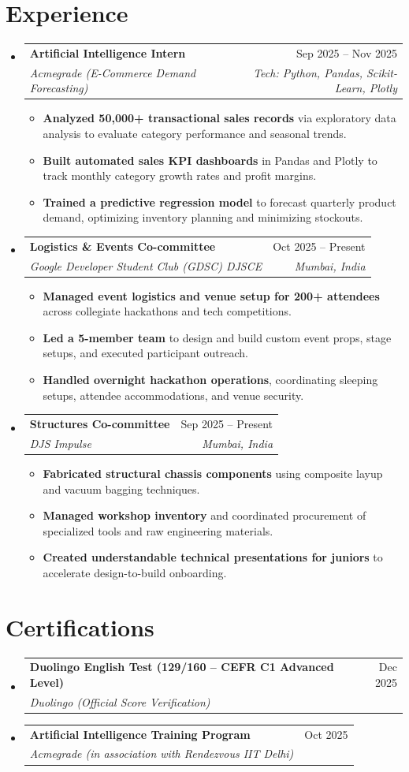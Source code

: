\documentclass[letterpaper,10pt]{article}
\makeatletter
\newcommand{\resumeItem}[1]{
  \item\small{#1}
}
\newcommand{\resumeSubheading}[4]{
  \item
    \begin{tabular*}{0.98\textwidth}[t]{l@{\extracolsep{\fill}}r}
      \textbf{#1} & \small#2 \\
      \textit{\small#3} & \textit{\small #4} \\
    \end{tabular*}\vspace{-2pt}
}
\newcommand{\resumeSubHeadingListStart}{\begin{itemize}[leftmargin=0.12in, label={}, itemsep=3pt, parsep=0pt, topsep=2pt]}
\newcommand{\resumeSubHeadingListEnd}{\end{itemize}}
\newcommand{\resumeItemListStart}{\begin{itemize}[leftmargin=0.18in, itemsep=1.5pt, parsep=0pt, topsep=1.5pt, partopsep=0pt]}
\newcommand{\resumeItemListEnd}{\end{itemize}\vspace{-2pt}}
\makeatother
\begin{document}
\section{Experience}
  \resumeSubHeadingListStart
    \resumeSubheading
      {Artificial Intelligence Intern}{Sep 2025 -- Nov 2025}
      {Acmegrade (E-Commerce Demand Forecasting)}{Tech: Python, Pandas, Scikit-Learn, Plotly}
      \resumeItemListStart
        \resumeItem{\textbf{Analyzed 50,000+ transactional sales records} via exploratory data analysis to evaluate category performance and seasonal trends.}
        \resumeItem{\textbf{Built automated sales KPI dashboards} in Pandas and Plotly to track monthly category growth rates and profit margins.}
        \resumeItem{\textbf{Trained a predictive regression model} to forecast quarterly product demand, optimizing inventory planning and minimizing stockouts.}
      \resumeItemListEnd

    \resumeSubheading
      {Logistics \& Events Co-committee}{Oct 2025 -- Present}
      {Google Developer Student Club (GDSC) DJSCE}{Mumbai, India}
      \resumeItemListStart
        \resumeItem{\textbf{Managed event logistics and venue setup for 200+ attendees} across collegiate hackathons and tech competitions.}
        \resumeItem{\textbf{Led a 5-member team} to design and build custom event props, stage setups, and executed participant outreach.}
        \resumeItem{\textbf{Handled overnight hackathon operations}, coordinating sleeping setups, attendee accommodations, and venue security.}
      \resumeItemListEnd

    \resumeSubheading
      {Structures Co-committee}{Sep 2025 -- Present}
      {DJS Impulse}{Mumbai, India}
      \resumeItemListStart
        \resumeItem{\textbf{Fabricated structural chassis components} using composite layup and vacuum bagging techniques.}
        \resumeItem{\textbf{Managed workshop inventory} and coordinated procurement of specialized tools and raw engineering materials.}
        \resumeItem{\textbf{Created understandable technical presentations for juniors} to accelerate design-to-build onboarding.}
      \resumeItemListEnd
  \resumeSubHeadingListEnd

\section{Certifications}
  \resumeSubHeadingListStart
    \resumeSubheading
      {Duolingo English Test (129/160 -- CEFR C1 Advanced Level)}{Dec 2025}
      {Duolingo (Official Score Verification)}{}
    \resumeSubheading
      {Artificial Intelligence Training Program}{Oct 2025}
      {Acmegrade (in association with Rendezvous IIT Delhi)}{}
  \resumeSubHeadingListEnd
\end{document}
